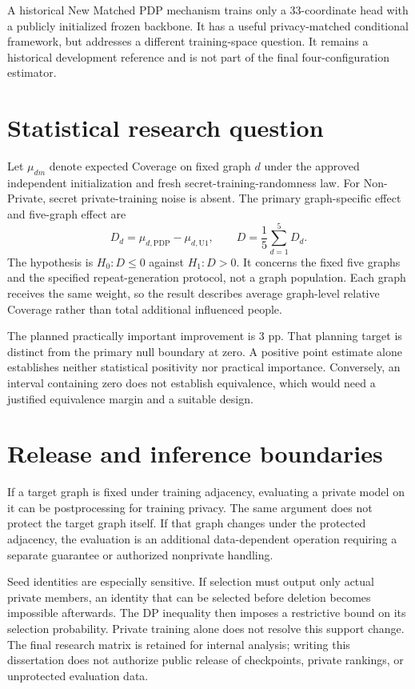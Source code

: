 A historical New Matched PDP mechanism trains only a 33-coordinate head with a publicly initialized frozen backbone. It has a useful privacy-matched conditional framework, but addresses a different training-space question. It remains a historical development reference and is not part of the final four-configuration estimator.

\section{Statistical research question}
Let $\mu_{dm}$ denote expected Coverage on fixed graph $d$ under the approved independent initialization and fresh secret-training-randomness law. For Non-Private, secret private-training noise is absent. The primary graph-specific effect and five-graph effect are
\begin{equation}
 D_d=\mu_{d,\mathrm{PDP}}-\mu_{d,\mathrm{U1}},\qquad
 D=\frac15\sum_{d=1}^{5}D_d.\label{eq:estimand}
\end{equation}
The hypothesis is $H_0:D\leq0$ against $H_1:D>0$. It concerns the fixed five graphs and the specified repeat-generation protocol, not a graph population. Each graph receives the same weight, so the result describes average graph-level relative Coverage rather than total additional influenced people.

The planned practically important improvement is 3 pp. That planning target is distinct from the primary null boundary at zero. A positive point estimate alone establishes neither statistical positivity nor practical importance. Conversely, an interval containing zero does not establish equivalence, which would need a justified equivalence margin and a suitable design.

\section{Release and inference boundaries}
If a target graph is fixed under training adjacency, evaluating a private model on it can be postprocessing for training privacy. The same argument does not protect the target graph itself. If that graph changes under the protected adjacency, the evaluation is an additional data-dependent operation requiring a separate guarantee or authorized nonprivate handling.

Seed identities are especially sensitive. If selection must output only actual private members, an identity that can be selected before deletion becomes impossible afterwards. The DP inequality then imposes a restrictive bound on its selection probability. Private training alone does not resolve this support change. The final research matrix is retained for internal analysis; writing this dissertation does not authorize public release of checkpoints, private rankings, or unprotected evaluation data.
